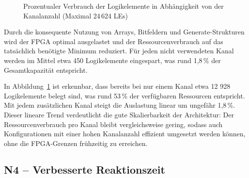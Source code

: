 \begin{figure}[H]
    \centering
    \caption{Prozentualer Verbrauch der Logikelemente in Abhängigkeit von der Kanalanzahl (Maximal 24\,624 LEs)}
    \label{fig:logikelemente_prozent}
\end{figure}

Durch die konsequente Nutzung von Arrays, Bitfeldern und Generate-Strukturen wird der FPGA optimal ausgelastet und der Ressourcenverbrauch auf das tatsächlich benötigte Minimum reduziert. Für jeden nicht verwendeten Kanal werden im Mittel etwa 450 Logikelemente eingespart, was rund 1,8\,\% der Gesamtkapazität entspricht.

In Abbildung~\ref{fig:logikelemente_prozent} ist erkennbar, dass bereits bei nur einem Kanal etwa 12 928 Logikelemente belegt sind, was rund 53\,\% der verfügbaren Ressourcen entspricht. Mit jedem zusätzlichen Kanal steigt die Auslastung linear um ungefähr 1,8\,\%. Dieser lineare Trend verdeutlicht die gute Skalierbarkeit der Architektur: Der Ressourcenverbrauch pro Kanal bleibt vergleichsweise gering, sodass auch Konfigurationen mit einer hohen Kanalanzahl effizient umgesetzt werden können, ohne die FPGA-Grenzen frühzeitig zu erreichen.

\subsection*{N4 – Verbesserte Reaktionszeit}

